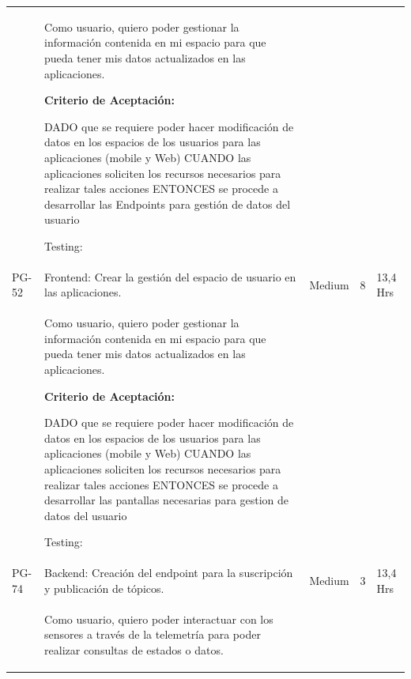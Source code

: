 \documentclass[11pt]{charter}
\begin{document}
\begin{landscape}
\begin{tabularx}{\linewidth}{@{}|p{1.3cm}|p{17cm}|p{1.7cm}|p{1.5cm}|p{1.7cm}|@{}}
         &  \begin{description}                 
                   \item Como usuario, quiero poder   gestionar la información contenida en mi espacio para que pueda tener mis   datos actualizados en las aplicaciones.                 
                   \item \textbf{Criterio de Aceptación:}                 
                   \item DADO que se requiere poder hacer modificación de datos en los espacios de   los usuarios para las aplicaciones (mobile y Web) CUANDO las aplicaciones soliciten los recursos necesarios para realizar   tales acciones ENTONCES se procede a desarrollar las Endpoints para gestión de datos del   usuario
                   \item Testing:                 
            \end{description}          &  &     & \\   
PG-52    & Frontend: Crear la gestión del   espacio de usuario en las aplicaciones.             & Medium             & 8   & 13,4  Hrs         \\
         &  \begin{description}                 
                   \item Como usuario, quiero poder   gestionar la información contenida en mi espacio para que pueda tener mis   datos actualizados en las aplicaciones.                 
                   \item \textbf{Criterio de Aceptación:}                 
                   \item DADO que se requiere poder hacer modificación de datos en los espacios de   los usuarios para las aplicaciones (mobile y Web) CUANDO las aplicaciones soliciten los recursos necesarios para realizar   tales acciones ENTONCES se procede a desarrollar las pantallas necesarias para gestion de   datos del usuario                          
                   \item Testing:                 
            \end{description}                 &  &     & \\
PG-74    & Backend: Creación del endpoint   para la suscripción y publicación de tópicos.       & Medium             & 3   & 13,4  Hrs         \\
         &  \begin{description}                 
                   \item Como usuario, quiero poder   interactuar con los sensores a través de la telemetría para poder realizar   consultas de estados o datos.                 

\end{description}
\end{tabularx}
\end{landscape}
\end{document}
